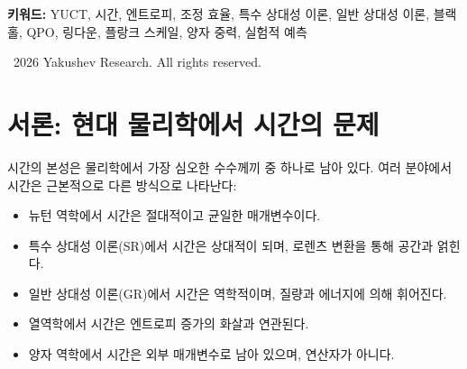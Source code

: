 \documentclass[12pt,a4paper]{article}
\begin{document}
\begin{titlepage}
\begin{center}
\begin{minipage}{0.9\textwidth}
\begin{abstract}
					나아가 이 틀을 블랙홀로 확장하여, 시간 요동의 질량에 대한 스케일링이 보편 지수 \(\beta = 0.67\)을 따름을 보인다. 시간 흐름의 상대적 불확실성은 \(\delta\tau/\tau \propto M^{-0.67}\)로 스케일링되며, 이는 구체적이고 검증 가능한 예측으로 이어진다: (i) 블랙홀 강착 원반의 준주기 진동(QPO)의 폭은 \(\Delta\nu/\nu \propto M^{-0.67}\)에 따라 질량과 함께 감소해야 한다; (ii) 병합하는 블랙홀의 링다운 주파수 분산은 동일한 법칙에 따라 질량과 함께 감소해야 한다. 이러한 예측은 기존의 X선 데이터(RXTE, NuSTAR) 및 중력파 관측(LIGO/Virgo, 미래의 Einstein Telescope)으로 검증할 수 있다. 이 틀은 시간의 상대론적, 중력적, 열역학적 측면을 통합하며, 보편적 스케일링 법칙 \(\beta = 0.67\)(부록 L) 및 복잡계의 진화 역학(부록 T)과 일관된 정합적인 그림을 제공한다.
				\end{abstract}
			\end{minipage}
			
			\vspace{1cm}
			
			\noindent
			\small\textbf{키워드:} YUCT, 시간, 엔트로피, 조정 효율, 특수 상대성 이론, 일반 상대성 이론, 블랙홀, QPO, 링다운, 플랑크 스케일, 양자 중력, 실험적 예측
			
			\vspace{0.5cm}
			
			\noindent
			\textcopyright\ 2026 Yakushev Research. All rights reserved.
		\end{center}
	\end{titlepage}
	
	\tableofcontents
	\newpage
	
	\section{서론: 현대 물리학에서 시간의 문제}
	\label{sec:intro}
	
	시간의 본성은 물리학에서 가장 심오한 수수께끼 중 하나로 남아 있다. 여러 분야에서 시간은 근본적으로 다른 방식으로 나타난다:
	\begin{itemize}
		\item 뉴턴 역학에서 시간은 절대적이고 균일한 매개변수이다.
		\item 특수 상대성 이론(SR)에서 시간은 상대적이 되며, 로렌츠 변환을 통해 공간과 얽힌다.
		\item 일반 상대성 이론(GR)에서 시간은 역학적이며, 질량과 에너지에 의해 휘어진다.
		\item 열역학에서 시간은 엔트로피 증가의 화살과 연관된다.
		\item 양자 역학에서 시간은 외부 매개변수로 남아 있으며, 연산자가 아니다.
	\end{itemize}
	
\end{document}
